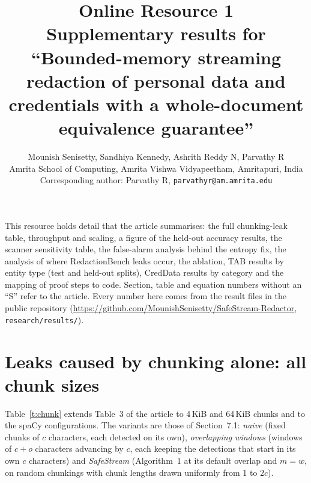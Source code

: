 \documentclass[11pt,a4paper]{article}
\title{Online Resource 1\\[4pt]\large Supplementary results for ``Bounded-memory streaming redaction of personal data and credentials with a whole-document equivalence guarantee''}
\author{Mounish Senisetty, Sandhiya Kennedy, Ashrith Reddy N, Parvathy R\\
\small Amrita School of Computing, Amrita Vishwa Vidyapeetham, Amritapuri, India\\
\small Corresponding author: Parvathy R, \texttt{parvathyr@am.amrita.edu}}
\date{}
\begin{document}
\maketitle

\noindent This resource holds detail that the article summarises: the full chunking-leak table, throughput and scaling, a figure of the held-out accuracy results, the scanner sensitivity table, the false-alarm analysis behind the entropy fix, the analysis of where RedactionBench leaks occur, the ablation, TAB results by entity type (test and held-out splits), CredData results by category and the mapping of proof steps to code. Section, table and equation numbers without an ``S'' refer to the article. Every number here comes from the result files in the public repository (\url{https://github.com/MounishSenisetty/SafeStream-Redactor}, \texttt{research/results/}).

\section{Leaks caused by chunking alone: all chunk sizes}\label{s:chunk}

Table~\ref{t:chunk} extends Table~3 of the article to 4\,KiB and 64\,KiB chunks and to the spaCy configurations. The variants are those of Section~7.1: \emph{naive} (fixed chunks of $c$ characters, each detected on its own), \emph{overlapping windows} (windows of $c + o$ characters advancing by $c$, each keeping the detections that start in its own $c$ characters) and \emph{SafeStream} (Algorithm~1 at its default overlap and $m = w$, on random chunkings with chunk lengths drawn uniformly from 1 to $2c$).
\end{document}
